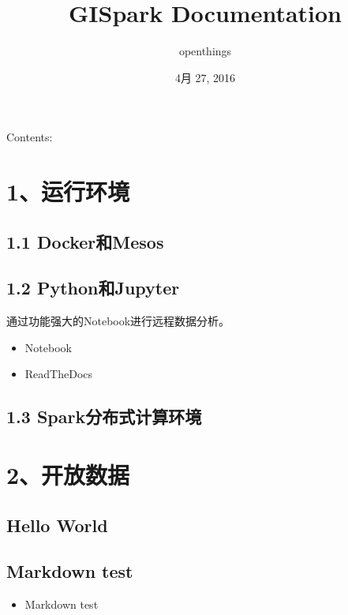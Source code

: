 \documentclass[letterpaper,10pt,english]{sphinxmanual}
\title{GISpark Documentation}
\date{4月 27, 2016}
\author{openthings}
\begin{document}
\maketitle
\tableofcontents
{}\label{index::doc}


Contents:


\chapter{1、运行环境}
\label{index:gispark}\label{index:id1}

\section{1.1 Docker和Mesos}
\label{index:dockermesos}

\section{1.2 Python和Jupyter}
\label{index:pythonjupyter}
通过功能强大的Notebook进行远程数据分析。
\begin{itemize}
\item {} 
Notebook

\item {} 
ReadTheDocs

\end{itemize}


\section{1.3 Spark分布式计算环境}
\label{index:spark}

\chapter{2、开放数据}
\label{index:id2}

\section{Hello World}
\label{helloworld:hello-world}\label{helloworld::doc}

\section{Markdown test}
\label{markit:markdown-test}\label{markit::doc}\begin{itemize}
\item {} 
Markdown test

\end{itemize}
\end{document}
